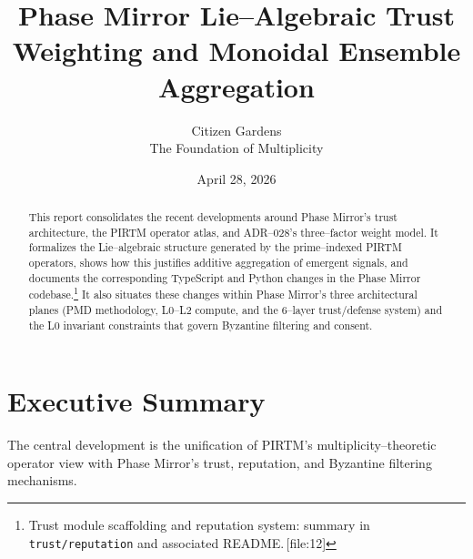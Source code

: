 \documentclass[11pt]{article}
\title{Phase Mirror  Lie--Algebraic Trust Weighting and Monoidal Ensemble Aggregation}
\author{Citizen Gardens \\ The Foundation of Multiplicity}
\date{April 28, 2026}
\begin{document}
\maketitle

\begin{abstract}
This report consolidates the recent developments around Phase Mirror's trust
architecture, the PIRTM operator atlas, and ADR--028's three--factor weight
model. It formalizes the Lie--algebraic structure generated by the prime--indexed
PIRTM operators, shows how this justifies additive aggregation of emergent
signals, and documents the corresponding TypeScript and Python changes in the
Phase Mirror codebase.\footnote{Trust module scaffolding and reputation system:
summary in \texttt{trust/reputation} and associated README.\,[file:12]}
It also situates these changes within Phase Mirror's three architectural planes
(PMD methodology, L0--L2 compute, and the 6--layer trust/defense system) and the
L0 invariant constraints that govern Byzantine filtering and consent.
\end{abstract}
\newpage
\tableofcontents

\section{Executive Summary}

The central development is the unification of PIRTM's multiplicity--theoretic
operator view with Phase Mirror's trust, reputation, and Byzantine filtering
mechanisms.
\end{document}
